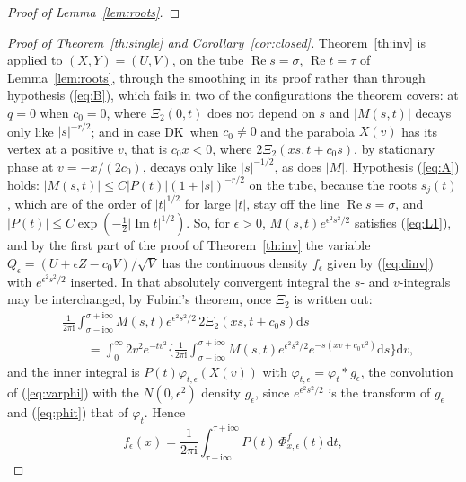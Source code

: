 \documentclass[ecta,nameyear,final]{econsocart}
\newcommand{\dr}[1]{{\mathrm d}#1}
\newcommand{\iu}{{\mathrm i}}
\newcommand{\Rea}{\operatorname{Re}}
\newcommand{\Ima}{\operatorname{Im}}
\newcommand{\Fk}{\textsf{\upshape DK}}
\theoremstyle{plain}
\theoremstyle{definition}
\begin{document}
\begin{appendix}
\begin{proof}[Proof of Lemma~\ref{lem:roots}]
\end{proof}\begin{proof}[Proof of Theorem~\ref{th:single} and Corollary~\ref{cor:closed}]
Theorem~\ref{th:inv} is applied to $(X,Y)=(U,V)$, on the tube $\Rea s=\sigma$, $\Rea t=\tau$ of Lemma~\ref{lem:roots}, through the smoothing in its proof rather than through hypothesis (\ref{eq:B}), which fails in two of the configurations the theorem covers: at $q=0$ when $c_0=0$, where $\Xi_2(0,t)$ does not depend on $s$ and $|M(s,t)|$ decays only like $|s|^{-r/2}$; and in case \Fk\ when $c_0\ne0$ and the parabola $X(v)$ has its vertex at a positive $v$, that is $c_0x<0$, where $2\Xi_2(xs,t+c_0s)$, by stationary phase at $v=-x/(2c_0)$, decays only like $|s|^{-1/2}$, as does $|M|$.  Hypothesis (\ref{eq:A}) holds: $|M(s,t)|\le C|P(t)|(1+|s|)^{-r/2}$ on the tube, because the roots $s_j(t)$, which are of the order of $|t|^{1/2}$ for large $|t|$, stay off the line $\Rea s=\sigma$, and $|P(t)|\le C\exp(-\frac12|\Ima t|^{1/2})$.  So, for $\epsilon>0$, $M(s,t)e^{\epsilon^2s^2/2}$ satisfies (\ref{eq:L1}), and by the first part of the proof of Theorem~\ref{th:inv} the variable $Q_\epsilon=(U+\epsilon Z-c_0V)/\sqrt V$ has the continuous density $f_\epsilon$ given by (\ref{eq:dinv}) with $e^{\epsilon^2s^2/2}$ inserted.  In that absolutely convergent integral the $s$- and $v$-integrals may be interchanged, by Fubini's theorem, once $\Xi_2$ is written out:
\begin{align*}
&\frac{1}{2\pi\iu}\int_{\sigma-\iu\infty}^{\sigma+\iu\infty}M(s,t)e^{\epsilon^2s^2/2}\,2\Xi_2(xs,t+c_0s)\dr{s}\\
&\qquad=\int_0^\infty2v^2e^{-tv^2}\Big\{\frac{1}{2\pi\iu}\int_{\sigma-\iu\infty}^{\sigma+\iu\infty}M(s,t)e^{\epsilon^2s^2/2}e^{-s(xv+c_0v^2)}\dr{s}\Big\}\dr{v},
\end{align*}
and the inner integral is $P(t)\varphi_{t,\epsilon}(X(v))$ with $\varphi_{t,\epsilon}=\varphi_t*g_\epsilon$, the convolution of (\ref{eq:varphi}) with the $N(0,\epsilon^2)$ density $g_\epsilon$, since $e^{\epsilon^2s^2/2}$ is the transform of $g_\epsilon$ and (\ref{eq:phit}) that of $\varphi_t$.  Hence
\[
f_\epsilon(x)=\frac{1}{2\pi\iu}\int_{\tau-\iu\infty}^{\tau+\iu\infty}P(t)\,\Phi^f_{x,\epsilon}(t)\dr{t},
\]

\end{proof}
\end{appendix}
\end{document}
